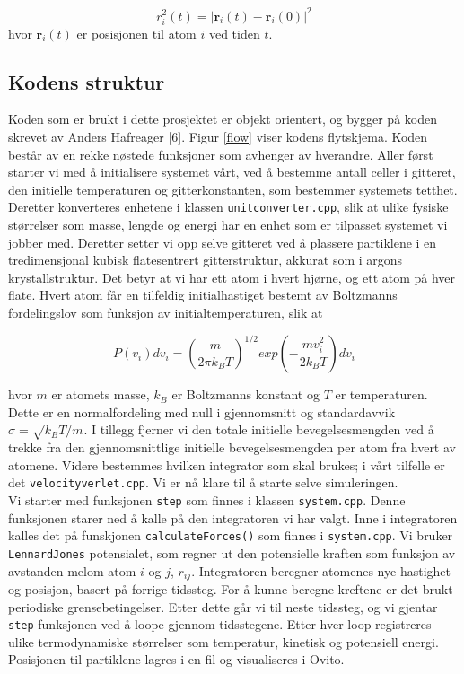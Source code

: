 \documentclass[paper=a4, fontsize=11pt]{scrartcl} %
\numberwithin{equation}{section} %
\numberwithin{figure}{section} %
\numberwithin{table}{section} %
\begin{document}
\begin{equation}
r_i^2 (t) = | \textbf{r}_i (t) - \textbf{r}_i (0) |^2
\end{equation} 
hvor $\textbf{r}_i (t)$ er posisjonen til atom $i$ ved tiden $t$.

\subsection{Kodens struktur}
Koden som er brukt i dette prosjektet er objekt orientert, og bygger på koden skrevet av Anders Hafreager [6]. Figur \ref{flow} viser kodens flytskjema. Koden består av en rekke nøstede funksjoner som avhenger av hverandre. Aller først starter vi med å initialisere systemet vårt, ved å bestemme antall celler i gitteret, den initielle temperaturen og gitterkonstanten, som bestemmer systemets tetthet. Deretter konverteres enhetene i klassen \texttt{unitconverter.cpp}, slik at ulike fysiske størrelser som masse, lengde og energi har en enhet som er tilpasset systemet vi jobber med. Deretter setter vi opp selve gitteret ved å plassere partiklene i en tredimensjonal kubisk flatesentrert gitterstruktur, akkurat som i argons krystallstruktur. Det betyr at vi har ett atom i hvert hjørne, og ett atom på hver flate. Hvert atom får en tilfeldig initialhastiget bestemt av Boltzmanns fordelingslov som funksjon av initialtemperaturen, slik at 

\begin{equation}
P(v_i)dv_i = \left(\frac{m}{2\pi k_B T} \right)^{1/2} exp \left(- \frac{mv_i^2}{2k_B T} \right)dv_i
\end{equation}

hvor $m$ er atomets masse, $k_B$ er Boltzmanns konstant og $T$ er temperaturen. Dette er en normalfordeling med null i gjennomsnitt og standardavvik $\sigma = \sqrt{k_B T/m}$. I tillegg fjerner vi den totale initielle bevegelsesmengden ved å trekke fra den gjennomsnittlige initielle bevegelsesmengden per atom fra hvert av atomene. Videre bestemmes hvilken integrator som skal brukes; i vårt tilfelle er det \texttt{velocityverlet.cpp}. Vi er nå klare til å starte selve simuleringen. \\

Vi starter med funksjonen \texttt{step} som finnes i klassen \texttt{system.cpp}. Denne funksjonen starer ned å kalle på den integratoren vi har valgt. Inne i integratoren kalles det på funskjonen \texttt{calculateForces()} som finnes i \texttt{system.cpp}. Vi bruker \texttt{LennardJones} potensialet, som regner ut den potensielle kraften som funksjon av avstanden melom atom $i$ og $j$, $r_{ij}$. Integratoren beregner atomenes nye hastighet og posisjon, basert på forrige tidssteg. For å kunne beregne kreftene er det brukt periodiske grensebetingelser. Etter dette går vi til neste tidssteg, og vi gjentar \texttt{step} funksjonen ved å loope gjennom tidsstegene. Etter hver loop registreres ulike termodynamiske størrelser som temperatur, kinetisk og potensiell energi. Posisjonen til partiklene lagres i en fil og visualiseres i Ovito. 
\end{document}
